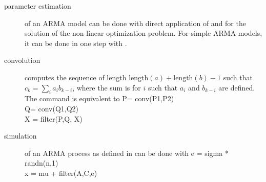 \begin{description}
\item[parameter estimation] of an ARMA model can be
done with direct application of 
and  for the solution of the non linear
optimization problem. For simple ARMA models, it can
be done in one step with .

\item[convolution]   computes the
sequence of length
$\mbox{length}(a)+\mbox{length}(b)-1$ such that
$c_k=\sum_i a_i b_{k-i}$, where the sum is for $i$
such that $a_i$ and $b_{k-i}$ are defined. The command
 is equivalent
to
\bp P\>= conv(P1,P2)\\
   Q\>= conv(Q1,Q2) \\
 X \>= filter(P,Q, X) \ep
%
\item[simulation] of an ARMA process as defined in  can be done with
\bp
 e \>=\> sigma * randn(n,1)\\
 x \>=\> mu + filter(A,C,e)
\ep
\end{description}

%
%
%
%



%

